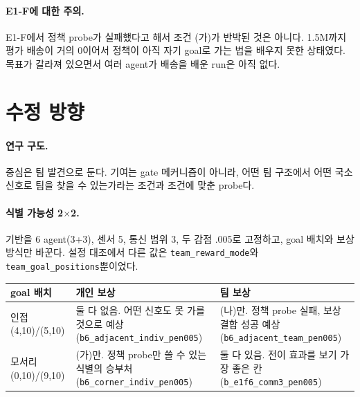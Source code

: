 \documentclass[11pt]{article}
\begin{document}
\paragraph{E1-F에 대한 주의.} E1-F에서 정책 probe가 실패했다고 해서 조건 (가)가 반박된 것은 아니다. 1.5M까지 평가 배송이 거의 0이어서 정책이 아직 자기 goal로 가는 법을 배우지 못한 상태였다. 목표가 갈라져 있으면서 여러 agent가 배송을 배운 run은 아직 없다.

\section{수정 방향}

\paragraph{연구 구도.} 중심은 팀 발견으로 둔다. 기여는 gate 메커니즘이 아니라, 어떤 팀 구조에서 어떤 국소 신호로 팀을 찾을 수 있는가라는 조건과 조건에 맞춘 probe다.

\paragraph{식별 가능성 2$\times$2.} 기반을 6 agent(3+3), 센서 5, 통신 범위 3, 두 감점 .005로 고정하고, goal 배치와 보상 방식만 바꾼다. 설정 대조에서 다른 값은 \texttt{team\_reward\_mode}와 \texttt{team\_goal\_positions}뿐이었다.
\begin{center}
\begin{tabularx}{\textwidth}{>{\raggedright\arraybackslash}p{2.6cm} L L}
\toprule
goal 배치 & 개인 보상 & 팀 보상 \\
\midrule
인접 (4,10)/(5,10) & 둘 다 없음. 어떤 신호도 못 가를 것으로 예상 (\texttt{b6\_adjacent\_indiv\_pen005}) & (나)만. 정책 probe 실패, 보상 결합 성공 예상 (\texttt{b6\_adjacent\_team\_pen005}) \\
모서리 (0,10)/(9,10) & (가)만. 정책 probe만 쓸 수 있는 식별의 승부처 (\texttt{b6\_corner\_indiv\_pen005}) & 둘 다 있음. 전이 효과를 보기 가장 좋은 칸 (\texttt{b\_e1f6\_comm3\_pen005}) \\
\bottomrule
\end{tabularx}
\end{center}
\end{document}
